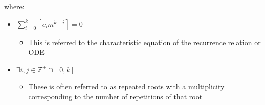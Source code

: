 \documentclass[11pt]{article}
\begin{document}
where:

\begin{itemize}
\item \(\sum^{k}_{i=0}\left[  c_{i}m^{k-i} \right] = 0\)
\begin{itemize}
\item This is referred to the characteristic equation of the recurrence relation or ODE \cite{levinSolvingRecurrenceRelations2018}
\end{itemize}
\item \(\exists i,j \in \mathbb{Z}^{+} \cap \left[0,k\right]\)
\begin{itemize}
\item These is often referred to as repeated roots \cite{levinSolvingRecurrenceRelations2018,zillMatrixExponential2009} with a multiplicity corresponding to the number of repetitions of that root \cite[]{nicodemiIntroductionAbstractAlgebra2007}
\end{itemize}
\end{itemize}
\end{document}
